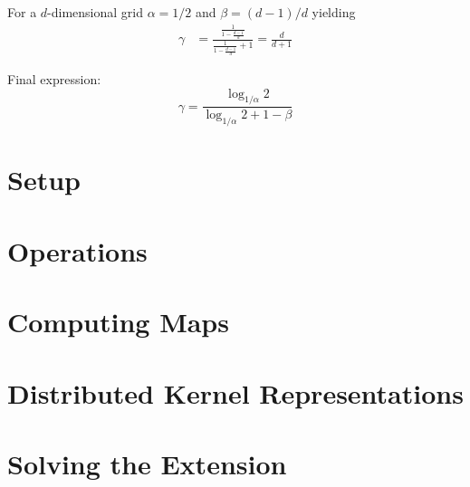 \documentclass{amsart}
\begin{document}
For a $d$-dimensional grid  $\alpha=1/2$ and $\beta =(d-1)/d$
yielding
\begin{align*}
	\gamma &= \frac{\frac{1}{1-\frac{d-1}{d}}}{\frac{1}{1-\frac{d-1}{d}}+1} = \frac{d}{d+1}
\end{align*}

Final expression:
$$ \gamma = \frac{\log_{1/\alpha} 2}{\log_{1/\alpha} 2 + 1 -\beta}$$
\section{Setup}


\section{Operations}

\section{Computing Maps}

\section{Distributed Kernel Representations}


\section{Solving the Extension}
\end{document}
